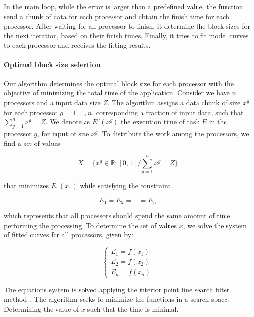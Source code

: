 \documentclass[journal]{IEEEtran}
\begin{document}
In the main loop, while the error is larger than a predefined value, the
function send a chunk of data for each processor and obtain the finish time for
each processor. After waiting for all processor to finish, it determine the
block sizes for the next iteration, based on their finish times. Finally, it
tries to fit model curves to each processor and receives the fitting results.

\vspace{0.2cm}
\paragraph*{Optimal block size selection} Our algorithm determines the optimal
block size for each processor with the objective of minimizing the total time of
the application. Consider we have $n$ processors and a input data size $Z$. The
algorithm assigns a data chunk of size $x^g$ for each processor $g=1,...,n$,
corresponding a fraction of input data, such that $\sum_{g=1}^n x^g = Z$. We
denote as $E^g(x^g)$ the execution time of task $E$ in the processor $g$, for
input of size $x^g$. To distribute the work among the processors, we find a set
of values
	
\begin{equation}
	X = \{ x^g \in \mathbb{R}:[0,1] / \sum_{g=1}^n x^g = Z \}
	\label{eq: totalResultado}
\end{equation}

that minimizes $E_1(x_1)$ while satisfying the constraint

\begin{equation}
	E_{1} = E_{2} = ...= E_{n}
	\label{eq: Restricao}
\end{equation}

which represents that all processors should spend the same amount of time
performing the processing. To determine the set of values $x$, we solve the
system of fitted curves for all processors, given by:

\begin{equation}
	\left\lbrace
	\begin{array}{ll}
		\displaystyle E_{1} = f(x_{1})  \\
		\displaystyle E_{2} = f(x_{2})   \\
		\displaystyle E_{n} = f(x_{n}) 
		\label{eq: system}
	\end{array}
	\right.
\end{equation}

The equations system is solved applying the interior point line search filter
method~\cite{point}. The algorithm seeks to minimize the functions in a search space. Determining the value of $x$ such that the time is minimal.
\end{document}
